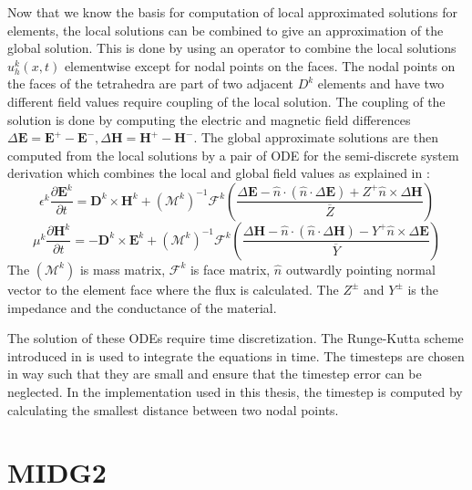 Now that we know the basis for computation of local approximated solutions for elements,
the local solutions can be combined to give an approximation of the global solution. This is
done by using an operator to combine the local solutions $ u_h^k(x,t) $ elementwise
except for nodal points on the faces. The nodal points
on the faces of the tetrahedra are part of two adjacent $ D^k $ elements and have two different
field values require coupling of the local solution. The coupling of the solution is done
by computing the electric and magnetic field differences \cite{kenter_opencl-based_2018} $\Delta \textbf{E}
= \textbf{E}^+-\textbf{E}^-, \Delta \textbf{H} = \textbf{H}^+ - \textbf{H}^-$.
The global approximate solutions are then computed from the local solutions \cite{kenter_opencl-based_2018, busch_discontinuous_2011}
by a pair of \ac{ODE} for the semi-discrete system derivation which combines the local and global
field values as explained in \cite{hesthaven_nodal_2008}:
\begin{equation}\label{eqn:pde_e}
\epsilon^k \frac{\partial \textbf{E}^k}{\partial t} = \textbf{D}^k \times \textbf{H}^k
+ (\mathcal{M}^k)^{-1}\mathcal{F}^k \left( \frac{\Delta\textbf{E}-\hat{n} \cdot (\hat{n} \cdot \Delta \textbf{E})+Z^+ \hat{n} \times \Delta \textbf{H} }{\overline{Z}} \right)
\end{equation}
\begin{equation}\label{eqn:pde_h}
    \mu^k \frac{\partial \textbf{H}^k}{\partial t} = - \textbf{D}^k \times \textbf{E}^k
    + (\mathcal{M}^k)^{-1} \mathcal{F}^k \left ( \frac{\Delta \textbf{H} -\hat{n} \cdot (\hat{n} \cdot \Delta \textbf{H})-Y^+ \hat{n} \times \Delta \textbf{E}}{\overline{Y}} \right)
\end{equation}
The $ (\mathcal{M}^k) $ is mass matrix, $\mathcal{F}^k$ is face matrix, $\hat{n}$ outwardly
pointing normal vector to the element face where the flux is calculated. The $ Z^\pm $ and $Y^\pm$ is the impedance and the conductance of the material.

The solution of these \ac{ODE}s require time discretization. The Runge-Kutta
scheme introduced in \cite{shu_total-variation-diminishing_1988} is used
\cite{hesthaven_nodal_2008, kenter_opencl-based_2018} to integrate the
equations in time. The timesteps are chosen in way such that they are small
and ensure that the timestep error can be neglected. In the implementation used
in this thesis, the timestep is computed by calculating the smallest distance between two nodal points.

\section{\acf{MIDG2}}
\label{sec:midg2_base}

